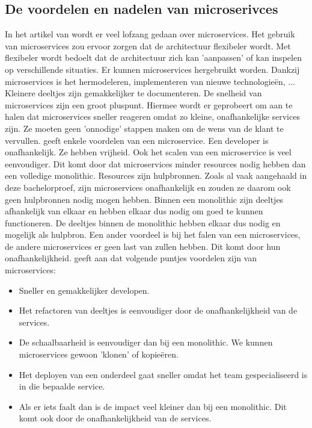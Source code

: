 \subsection{De voordelen en nadelen van microserivces}
In het artikel van \textcite{series2018} wordt er veel lofzang gedaan over microservices. Het gebruik van microservices zou ervoor zorgen dat de architectuur flexibeler wordt. Met flexibeler wordt bedoelt dat de architectuur zich kan 'aanpassen' of kan inspelen op verschillende situaties. Er kunnen microservices hergebruikt worden. Dankzij microservices is het hermodeleren, implementeren van nieuwe technologieën, ... 
Kleinere deeltjes zijn gemakkelijker te documenteren. De snelheid van microservices zijn een groot pluspunt. Hiermee wordt er geprobeert om aan te halen dat microservices sneller reageren omdat zo kleine, onafhankelijke services zijn. Ze moeten geen 'onnodige' stappen maken om de wens van de klant te vervullen. 
\textcite{Watts2018} geeft enkele voordelen van een microservice. Een developer is onafhankelijk. Ze hebben vrijheid. Ook het scalen van een microservice is veel eenvoudiger. Dit komt door dat microservices minder resources nodig hebben dan een volledige monolithic. Resources zijn hulpbronnen. Zoals al vaak aangehaald in deze bachelorproef, zijn microservices onafhankelijk en zouden ze daarom ook geen hulpbronnen nodig mogen hebben. Binnen een monolithic zijn deeltjes afhankelijk van elkaar en hebben elkaar dus nodig om goed te kunnen functioneren. De deeltjes binnen de monolithic hebben elkaar dus nodig en mogelijk als hulpbron. Een ander voordeel is bij het falen van een microservices, de andere microservices er geen last van zullen hebben. Dit komt door hun onafhankelijkheid. 
\textcite{Benetis2016} geeft aan dat volgende puntjes voordelen zijn van microservices:
\begin{itemize}
	\item Sneller en gemakkelijker developen.
	\item Het refactoren van deeltjes is eenvoudiger door de onafhankelijkheid van de services. 
	\item De schaalbaarheid is eenvoudiger dan bij een monolithic. We kunnen microservices gewoon 'klonen' of kopieëren. 
	\item Het deployen van een onderdeel gaat sneller omdat het team gespecialiseerd is in die bepaalde service.
	\item Als er iets faalt dan is de impact veel kleiner dan bij een monolithic. Dit komt ook door de onafhankelijkheid van de services. 
\end{itemize}

